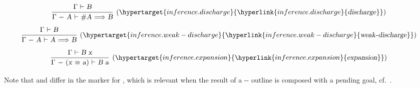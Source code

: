 \begin{isabellebody}
\begin{isamarkuptext}
  \[
  \infer[(\indexdef{}{inference}{discharge}\hypertarget{inference.discharge}{\hyperlink{inference.discharge}{\mbox{\isa{discharge}}}})]{\isa{{\isaliteral{22}{\isachardoublequote}}{\isaliteral{5C3C73747275743E}{\isasymstrut}}{\isaliteral{5C3C47616D6D613E}{\isasymGamma}}\ {\isaliteral{2D}{\isacharminus}}\ A\ {\isaliteral{5C3C7475726E7374696C653E}{\isasymturnstile}}\ {\isaliteral{23}{\isacharhash}}A\ {\isaliteral{5C3C4C6F6E6772696768746172726F773E}{\isasymLongrightarrow}}\ B{\isaliteral{22}{\isachardoublequote}}}}{\isa{{\isaliteral{22}{\isachardoublequote}}{\isaliteral{5C3C73747275743E}{\isasymstrut}}{\isaliteral{5C3C47616D6D613E}{\isasymGamma}}\ {\isaliteral{5C3C7475726E7374696C653E}{\isasymturnstile}}\ B{\isaliteral{22}{\isachardoublequote}}}}
  \]
  \[
  \infer[(\indexdef{}{inference}{weak-discharge}\hypertarget{inference.weak-discharge}{\hyperlink{inference.weak-discharge}{\mbox{\isa{weak{\isaliteral{5C3C646173683E}{\isasymdash}}discharge}}}})]{\isa{{\isaliteral{22}{\isachardoublequote}}{\isaliteral{5C3C73747275743E}{\isasymstrut}}{\isaliteral{5C3C47616D6D613E}{\isasymGamma}}\ {\isaliteral{2D}{\isacharminus}}\ A\ {\isaliteral{5C3C7475726E7374696C653E}{\isasymturnstile}}\ A\ {\isaliteral{5C3C4C6F6E6772696768746172726F773E}{\isasymLongrightarrow}}\ B{\isaliteral{22}{\isachardoublequote}}}}{\isa{{\isaliteral{22}{\isachardoublequote}}{\isaliteral{5C3C73747275743E}{\isasymstrut}}{\isaliteral{5C3C47616D6D613E}{\isasymGamma}}\ {\isaliteral{5C3C7475726E7374696C653E}{\isasymturnstile}}\ B{\isaliteral{22}{\isachardoublequote}}}}
  \]
  \[
  \infer[(\indexdef{}{inference}{expansion}\hypertarget{inference.expansion}{\hyperlink{inference.expansion}{\mbox{\isa{expansion}}}})]{\isa{{\isaliteral{22}{\isachardoublequote}}{\isaliteral{5C3C73747275743E}{\isasymstrut}}{\isaliteral{5C3C47616D6D613E}{\isasymGamma}}\ {\isaliteral{2D}{\isacharminus}}\ {\isaliteral{28}{\isacharparenleft}}x\ {\isaliteral{5C3C65717569763E}{\isasymequiv}}\ a{\isaliteral{29}{\isacharparenright}}\ {\isaliteral{5C3C7475726E7374696C653E}{\isasymturnstile}}\ B\ a{\isaliteral{22}{\isachardoublequote}}}}{\isa{{\isaliteral{22}{\isachardoublequote}}{\isaliteral{5C3C73747275743E}{\isasymstrut}}{\isaliteral{5C3C47616D6D613E}{\isasymGamma}}\ {\isaliteral{5C3C7475726E7374696C653E}{\isasymturnstile}}\ B\ x{\isaliteral{22}{\isachardoublequote}}}}
  \]

  \medskip Note that \hyperlink{inference.discharge}{\mbox{}} and \hyperlink{inference.weak-discharge}{\mbox{}} differ in the marker for , which is
  relevant when the result of a \hyperlink{command.fix}{\mbox{}}-\hyperlink{command.assume}{\mbox{}}-\hyperlink{command.show}{\mbox{}} outline is composed with a pending goal,
  cf.\ .


\end{isamarkuptext}
\end{isabellebody}
